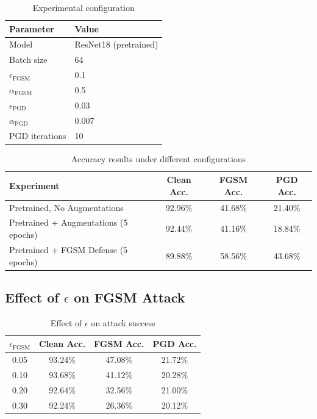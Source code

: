 \documentclass[11pt]{article}
\begin{document}
\begin{table}[h]
\centering
\begin{tabular}{ll}
\toprule
\textbf{Parameter} & \textbf{Value} \\
\midrule
Model & ResNet18 (pretrained) \\
Batch size & 64 \\
$\epsilon_{\text{FGSM}}$ & 0.1 \\
$\alpha_{\text{FGSM}}$ & 0.5 \\
$\epsilon_{\text{PGD}}$ & 0.03 \\
$\alpha_{\text{PGD}}$ & 0.007 \\
PGD iterations & 10 \\
\bottomrule
\end{tabular}
\caption{Experimental configuration}
\end{table}

\begin{table}[h]
\centering
\begin{tabular}{lccc}
\toprule
\textbf{Experiment} & \textbf{Clean Acc.} & \textbf{FGSM Acc.} & \textbf{PGD Acc.} \\
\midrule
Pretrained, No Augmentations & 92.96\% & 41.68\% & 21.40\% \\
Pretrained + Augmentations (5 epochs) & 92.44\% & 41.16\% & 18.84\% \\
Pretrained + FGSM Defense (5 epochs) & 89.88\% & 58.56\% & 43.68\% \\
\bottomrule
\end{tabular}
\caption{Accuracy results under different configurations}
\end{table}

\subsection{Effect of $\epsilon$ on FGSM Attack}
\begin{table}[h]
\centering
\begin{tabular}{cccc}
\toprule
$\epsilon_{\text{FGSM}}$ & \textbf{Clean Acc.} & \textbf{FGSM Acc.} & \textbf{PGD Acc.} \\
\midrule
0.05 & 93.24\% & 47.08\% & 21.72\% \\
0.10 & 93.68\% & 41.12\% & 20.28\% \\
0.20 & 92.64\% & 32.56\% & 21.00\% \\
0.30 & 92.24\% & 26.36\% & 20.12\% \\
\bottomrule
\end{tabular}
\caption{Effect of $\epsilon$ on attack success}
\end{table}
\end{document}
